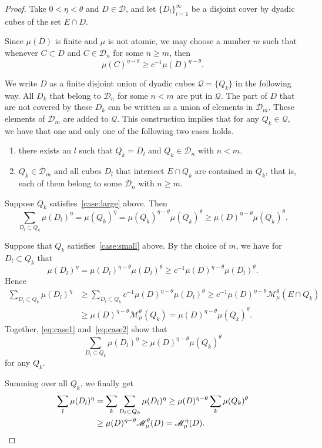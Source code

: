 \documentclass[10pt]{amsart}
\theoremstyle{definition}\newtheorem{defi}[theo]{Definition}\newtheorem{rema}[theo]{Remark}\newtheorem{exam}[theo]{Example}\newtheorem{exem}[theo]{Example}\newtheorem{nota}[theo]{Notation}
\begin{document}
\begin{proof}
Take $0 < \eta < \theta$ and $D \in \mathscr{D}$, and let $\{D_l\}_{l=1}^\infty$ be a disjoint cover by dyadic cubes of the set $E \cap D$.

Since $\mu (D)$ is finite and $\mu$ is not atomic, we may choose a number $m$ such that whenever $C \subset D$ and $C \in
\mathscr{D}_n$ for some $n \geq m$, then
\[
\mu (C)^{\eta-\theta} \geq c^{-1} \mu (D)^{\eta-\theta}.
\]

We write $D$ as a finite disjoint union of dyadic cubes $\mathscr{Q} = \{Q_k\}$ in the following way. All $D_k$ that belong to $\mathscr{D}_n$ for some $n < m$ are put in $\mathscr{Q}$. The part of $D$ that are not covered by these $D_k$ can be written as a union of elements in $\mathscr{D}_m$. These elements of $\mathscr{D}_m$ are added to $\mathscr{Q}$. This construction implies that for any $Q_k \in \mathscr{Q}$, we have that one and only one of the following two cases holds.
\renewcommand{\theenumi}{\roman{enumi}}
\begin{enumerate}
\item \label{case:large}
there exists an $l$ such that $Q_k = D_l$ and $Q_k \in
\mathscr{D}_n$ with $n < m$.
\item \label{case:small}
$Q_k \in \mathscr{D}_m$ and all cubes $D_l$ that intersect $E
\cap Q_k$ are contained in $Q_k$, that is, each of them belong to some $\mathscr{D}_n$ with $n \geq m$.
\end{enumerate}

Suppose $Q_k$ satisfies~\eqref{case:large} above. Then
\begin{equation}\label{eq:case1}
\sum_{D_l \subset Q_k} \mu (D_l)^\eta = \mu (Q_k)^\eta = \mu (Q_k)^{\eta-\theta} \mu (Q_k)^\theta \geq \mu (D)^{\eta-\theta}
\mu (Q_k)^\theta.
\end{equation}

Suppose that $Q_k$ satisfies~\eqref{case:small} above. By the choice of $m$, we have for $D_l \subset Q_k$ that
\[
\mu (D_l)^\eta = \mu (D_l)^{\eta-\theta} \mu (D_l)^\theta \geq c^{-1} \mu (D)^{\eta-\theta} \mu (D_l)^\theta.
\]
Hence
\begin{align}
\sum_{D_l \subset Q_k} \mu (D_l)^\eta &\geq \sum_{D_l \subset Q_k} c^{-1} \mu (D)^{\eta-\theta} \mu (D_l)^\theta \geq c^{-1} \mu (D)^{\eta-\theta} \mathscr{M}_\mu^\theta (E \cap Q_k) \nonumber
\\ &\geq \mu (D)^{\eta-\theta} \mathscr{M}_\mu^\theta (Q_k) = \mu (D)^{\eta-\theta} \mu (Q_k)^\theta. \label{eq:case2}
\end{align}
Together, \eqref{eq:case1} and~\eqref{eq:case2} show that
\[
\sum_{D_l \subset Q_k} \mu (D_l)^\eta \geq \mu (D)^{\eta-\theta} \mu (Q_k)^\theta
\]
for any $Q_k$.

Summing over all $Q_k$, we finally get
\begin{align*}
\sum_l \mu (D_l)^\eta &= \sum_k \sum_{D_l \subset Q_k} \mu (D_l)^\eta \geq \mu (D)^{\eta-\theta} \sum_k \mu (Q_k)^\theta
\\ &\geq \mu (D)^{\eta-\theta} \mathscr{M}_\mu^\theta (D) =
\mathscr{M}_\mu^\eta (D). \qedhere
\end{align*}
\end{proof}
\end{document}
